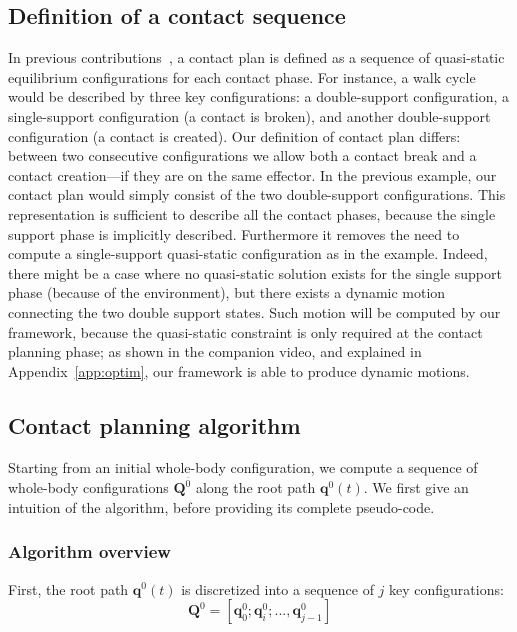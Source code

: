 \documentclass[journal]{IEEEtran}
\begin{document}
\subsection{Definition of a contact sequence}
In previous contributions~\citep{DBLP:conf/iser/EscandeKMG08}, a contact plan is defined as a sequence of quasi-static equilibrium configurations
for each contact phase. For instance, a walk cycle would be described by three key configurations: a double-support configuration, a single-support configuration (a contact is broken), and another double-support configuration (a contact is created). 
Our definition of contact plan differs: between two consecutive configurations we allow both a contact break and a contact creation---if they are on the same effector. 
In the previous example, our contact plan would simply consist of the two double-support configurations. 
This representation is sufficient to describe all the contact phases, because the single support phase is implicitly described. Furthermore it removes the need to compute a single-support quasi-static configuration as in the example. Indeed, there might be a case where no quasi-static solution exists for the single support phase (because of the environment), but
there exists a dynamic motion connecting the two double support states. Such motion will be computed by our framework, because the quasi-static constraint is only required at the contact planning phase; as shown in the companion video, and explained in Appendix~\ref{app:optim}, our framework is able to produce dynamic motions.

\subsection{Contact planning algorithm}
Starting from an initial whole-body configuration, we compute a sequence
of whole-body configurations  $\mathbf{Q}^{\overline{0}}$ along the root path $\mathbf{q}^0(t)$.
We first give an intuition of the algorithm, before providing its complete pseudo-code.
\subsubsection{Algorithm overview}
First, the root path $\mathbf{q}^0(t)$ is discretized into a sequence of $j$ key configurations:  
\begin{equation*}
	\mathbf{Q}^0 = [\mathbf{q}^0_{0}; \mathbf{q}^0_{i}; ..., \mathbf{q}^0_{j-1}]
\end{equation*} 
\end{document}
